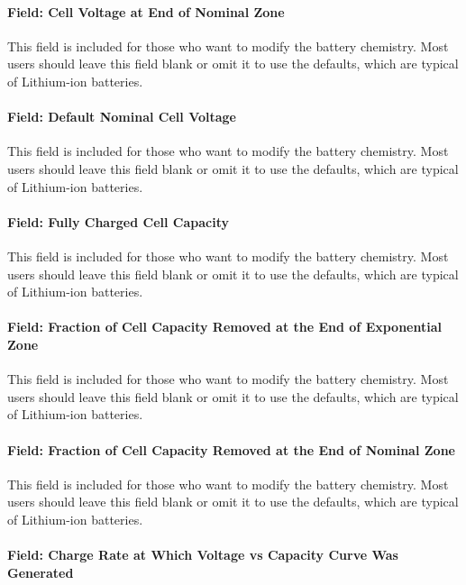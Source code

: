 \paragraph{Field: Cell Voltage at End of Nominal Zone}\label{liion-vnom}

This field is included for those who want to modify the battery chemistry. Most users should leave this field blank or omit it to use the defaults, which are typical of Lithium-ion batteries.

\paragraph{Field: Default Nominal Cell Voltage}\label{liion-vnom-default}

This field is included for those who want to modify the battery chemistry. Most users should leave this field blank or omit it to use the defaults, which are typical of Lithium-ion batteries.

\paragraph{Field: Fully Charged Cell Capacity}\label{liion-qfull}

This field is included for those who want to modify the battery chemistry. Most users should leave this field blank or omit it to use the defaults, which are typical of Lithium-ion batteries.

\paragraph{Field: Fraction of Cell Capacity Removed at the End of Exponential Zone}\label{liion-qexp}

This field is included for those who want to modify the battery chemistry. Most users should leave this field blank or omit it to use the defaults, which are typical of Lithium-ion batteries.

\paragraph{Field: Fraction of Cell Capacity Removed at the End of Nominal Zone}\label{liion-qnom}

This field is included for those who want to modify the battery chemistry. Most users should leave this field blank or omit it to use the defaults, which are typical of Lithium-ion batteries.

\paragraph{Field: Charge Rate at Which Voltage vs Capacity Curve Was Generated}\label{liion-crate}

